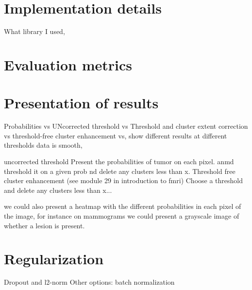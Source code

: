 \section{Implementation details}
What library I used,

\section{Evaluation metrics}

\section{Presentation of results}
Probabilities vs UNcorrected threshold vs Threshold and cluster extent correction vs threshold-free cluster enhancement vs, show different results at different thresholds
data is smooth, 

uncorrected threshold
Present the probabilities of tumor on each pixel. anmd threshold it on a given prob nd delete any clusters less than x.
Threshold free cluster enhancement (see module 29 in introduction to fmri)
Choose a threshold and delete any clusters less than x...

we could also present a heatmap with the different probabilities in each pixel of the image, for instance on mammograms we could present a grayscale image of whether a lesion is present.



\section{Regularization}
Dropout and l2-norm
Other options: batch normalization

